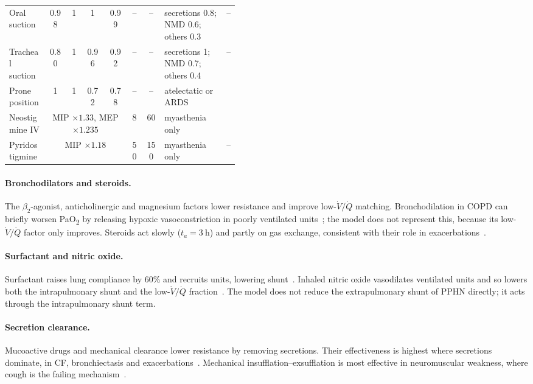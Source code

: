 \begin{table}[htbp]
\begin{tabular}{@{}>{\raggedright\arraybackslash}p{0.17\linewidth}cccccc>{\raggedright\arraybackslash}p{0.27\linewidth}l@{}}
Oral suction & 0.98 & 1 & 1 & 0.99 & -- & -- & secretions 0.8; NMD 0.6; others 0.3 & --\\
Tracheal suction & 0.80 & 1 & 0.96 & 0.92 & -- & -- & secretions 1; NMD 0.7; others 0.4 & --\\
Prone position & 1 & 1 & 0.72 & 0.78 & -- & -- & atelectatic or ARDS & \citep{guerin2013}\\\midrule
Neostigmine IV & \multicolumn{4}{c}{MIP $\times1.33$, MEP $\times1.235$} & 8 & 60 & myasthenia only & \citep{radwan1988}\\
Pyridostigmine & \multicolumn{4}{c}{MIP $\times1.18$} & 50 & 150 & myasthenia only & --\\
\bottomrule
\end{tabular}
\end{table}

\paragraph{Bronchodilators and steroids.} The $\beta_2$-agonist, anticholinergic and magnesium factors lower resistance and improve low-$\dot V/\dot Q$ matching. Bronchodilation in COPD can briefly worsen PaO\textsubscript{2} by releasing hypoxic vasoconstriction in poorly ventilated units~\citep{gross1987}; the model does not represent this, because its low-$\dot V/\dot Q$ factor only improves. Steroids act slowly ($t_a=\SI{3}{\hour}$) and partly on gas exchange, consistent with their role in exacerbations~\citep{niewoehner1999}.

\paragraph{Surfactant and nitric oxide.} Surfactant raises lung compliance by 60\% and recruits units, lowering shunt~\citep{engle2008}. Inhaled nitric oxide vasodilates ventilated units and so lowers both the intrapulmonary shunt and the low-$\dot V/\dot Q$ fraction~\citep{clark2000}. The model does not reduce the extrapulmonary shunt of PPHN directly; it acts through the intrapulmonary shunt term.

\paragraph{Secretion clearance.} Mucoactive drugs and mechanical clearance lower resistance by removing secretions. Their effectiveness is highest where secretions dominate, in CF, bronchiectasis and exacerbations~\citep{donaldson2006,fuchs1994,ramsey1999}. Mechanical insufflation--exsufflation is most effective in neuromuscular weakness, where cough is the failing mechanism~\citep{bach1993}.

